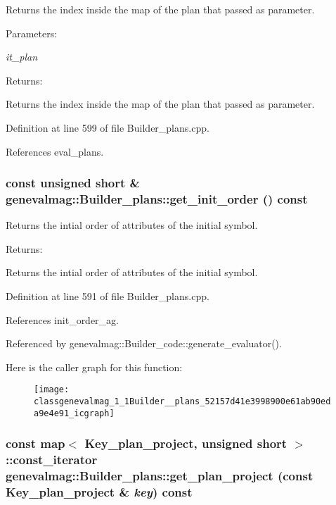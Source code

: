 Returns the index inside the map of the plan that passed as parameter. \begin{Desc}
\item[Parameters:]
\begin{description}
\item[{\em it\_\-plan}]\end{description}
\end{Desc}
\begin{Desc}
\item[Returns:]\end{Desc}
Returns the index inside the map of the plan that passed as parameter. 

Definition at line 599 of file Builder\_\-plans.cpp.

References eval\_\-plans.\hypertarget{classgenevalmag_1_1Builder__plans_52157d41e3998900e61ab90eda9e4e91}{
\subsubsection[{get\_\-init\_\-order}]{\setlength{\rightskip}{0pt plus 5cm}const unsigned short \& genevalmag::Builder\_\-plans::get\_\-init\_\-order () const}}
\label{classgenevalmag_1_1Builder__plans_52157d41e3998900e61ab90eda9e4e91}


Returns the intial order of attributes of the initial symbol. \begin{Desc}
\item[Returns:]\end{Desc}
Returns the intial order of attributes of the initial symbol. 

Definition at line 591 of file Builder\_\-plans.cpp.

References init\_\-order\_\-ag.

Referenced by genevalmag::Builder\_\-code::generate\_\-evaluator().

Here is the caller graph for this function:\nopagebreak
\begin{figure}[H]
\begin{center}
\leavevmode
\texttt{[image: classgenevalmag\_1\_1Builder\_\_plans\_52157d41e3998900e61ab90eda9e4e91\_icgraph]}
\end{center}
\end{figure}
\hypertarget{classgenevalmag_1_1Builder__plans_2aecc3840ac5d583959073e5d7657b34}{
\subsubsection[{get\_\-plan\_\-project}]{\setlength{\rightskip}{0pt plus 5cm}const map$<$ {\bf Key\_\-plan\_\-project}, unsigned short $>$::const\_\-iterator genevalmag::Builder\_\-plans::get\_\-plan\_\-project (const {\bf Key\_\-plan\_\-project} \& {\em key}) const}}
\label{classgenevalmag_1_1Builder__plans_2aecc3840ac5d583959073e5d7657b34}


